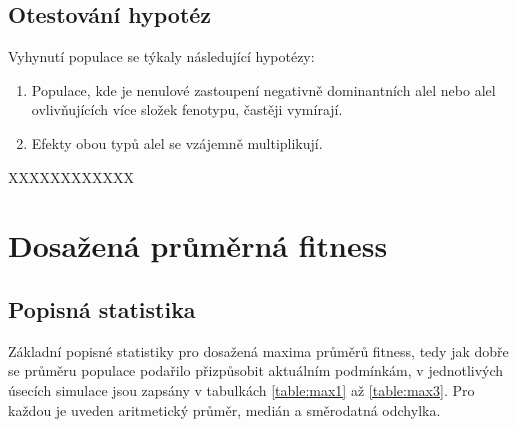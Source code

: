 \subsection{Otestování hypotéz}

Vyhynutí populace se týkaly následující hypotézy:

\begin{enumerate}
    \item{Populace, kde je nenulové zastoupení negativně dominantních alel nebo alel ovlivňujících více složek fenotypu,
          častěji vymírají.}
    \item{Efekty obou typů alel se vzájemně multiplikují.}
\end{enumerate}

XXXXXXXXXXXX


\section{Dosažená průměrná fitness}

\subsection{Popisná statistika}

Základní popisné statistiky pro dosažená maxima průměrů fitness, tedy jak dobře se průměru populace podařilo
přizpůsobit aktuálním podmínkám, v jednotlivých úsecích simulace jsou zapsány v tabulkách \ref{table:max1}
až \ref{table:max3}. Pro každou je uveden aritmetický průměr, medián a směrodatná odchylka.

